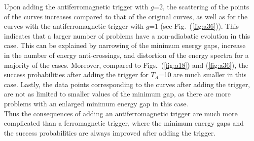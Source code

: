\documentclass[../main.tex]{subfiles}
\begin{document}
Upon adding the antiferromagnetic trigger with $g$=2, the scattering of the points of the curves increases compared to that of the original curves, as well as for the curves with the antiferromagnetic trigger with $g$=1 (see Fig.~(\ref{fig:a36})). This indicates that a larger number of problems have a non-adiabatic evolution in this case. This can be explained by narrowing of the minimum energy gaps, increase in the number of energy anti-crossings, and distortion of the energy spectra for a majority of the cases. Moreover, compared to Figs.~(\ref{fig:a18}) and (\ref{fig:a36}), the success probabilities after adding the trigger for $T_A$=10 are much smaller in this case. Lastly, the data points corresponding to the curves after adding the trigger, are not as limited to smaller values of the minimum gap, as there are more problems with an enlarged minimum energy gap in this case.\\

Thus the consequences of adding an antiferromagnetic trigger are much more complicated than a ferromagnetic trigger, where the minimum energy gaps and the success probabilities are always improved after adding the trigger.
\end{document}
